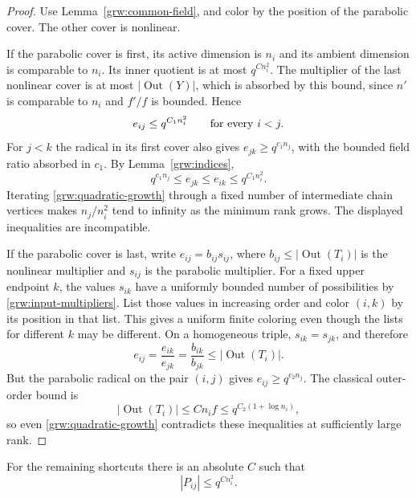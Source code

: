 \begin{proof}
Use Lemma~\ref{grw:common-field}, and color by the position of the
parabolic cover.  The other cover is nonlinear.

If the parabolic cover is first, its active dimension is $n_i$ and its
ambient dimension is comparable to $n_i$.  Its inner quotient is at
most $q^{C n_i^2}$.  The multiplier of the last nonlinear cover is at
most $|\operatorname{Out}(Y)|$, which is absorbed by this bound, since
$n'$ is comparable to $n_i$ and $f'/f$ is bounded.  Hence
\begin{equation}\label{grw:first-radical-upper}
 e_{ij}\le q^{C_1 n_i^2}\qquad\hbox{for every }i<j.
\end{equation}
For $j<k$ the radical in its first cover also gives
$e_{jk}\ge q^{c_1 n_j}$, with the bounded field ratio absorbed in $c_1$.
By Lemma~\ref{grw:indices},
\[
 q^{c_1 n_j}\le e_{jk}\le e_{ik}\le q^{C_1 n_i^2}.
\]
Iterating \eqref{grw:quadratic-growth} through a fixed number of
intermediate chain vertices makes $n_j/n_i^2$ tend to infinity as the
minimum rank grows.  The displayed inequalities are incompatible.

If the parabolic cover is last, write $e_{ij}=b_{ij}s_{ij}$, where
$b_{ij}\le|\operatorname{Out}(T_i)|$ is the nonlinear multiplier and
$s_{ij}$ is the parabolic multiplier.  For a fixed upper endpoint $k$,
the values $s_{ik}$ have a uniformly bounded number of possibilities
by \ref{grw:input-multipliers}.  List those values in increasing order
and color $(i,k)$ by its position in that list.  This gives a uniform
finite coloring even though the lists for different $k$ may be
different.  On a homogeneous triple, $s_{ik}=s_{jk}$, and therefore
\[
 e_{ij}=\frac{e_{ik}}{e_{jk}}
       =\frac{b_{ik}}{b_{jk}}
       \le |\operatorname{Out}(T_i)|.
\]
But the parabolic radical on the pair $(i,j)$ gives
$e_{ij}\ge q^{c_2n_j}$.  The classical outer-order bound is
\[
 |\operatorname{Out}(T_i)|\le C n_i f
                         \le q^{C_2(1+\log n_i)},
\]
so even \eqref{grw:quadratic-growth} contradicts these inequalities
at sufficiently large rank.
\end{proof}

\begin{lemma}\label{grw:inner-order}
For the remaining shortcuts there is an absolute $C$ such that
\begin{equation}\label{grw:inner-small}
 |P_{ij}|\le q^{C n_i^2}.
\end{equation}
\end{lemma}

